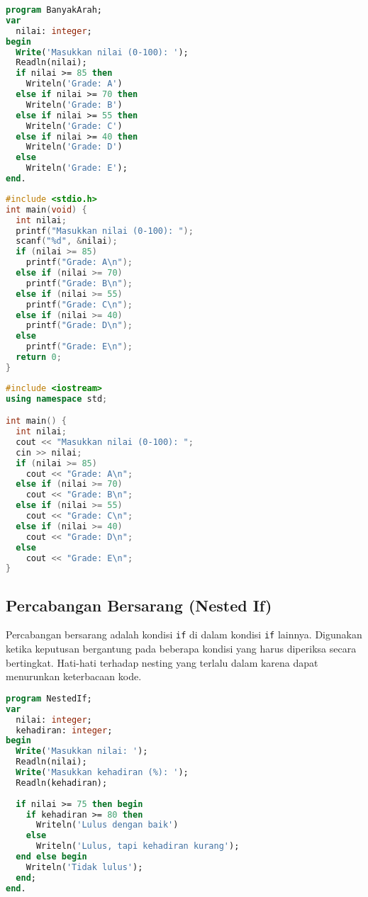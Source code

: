 \documentclass[../main.tex]{subfiles}
\begin{document}
\begin{lstlisting}[language=Pascal, caption={Percabangan banyak arah di Pascal}]
program BanyakArah;
var
  nilai: integer;
begin
  Write('Masukkan nilai (0-100): ');
  Readln(nilai);
  if nilai >= 85 then
    Writeln('Grade: A')
  else if nilai >= 70 then
    Writeln('Grade: B')
  else if nilai >= 55 then
    Writeln('Grade: C')
  else if nilai >= 40 then
    Writeln('Grade: D')
  else
    Writeln('Grade: E');
end.
\end{lstlisting}

\begin{lstlisting}[language=C, caption={Percabangan banyak arah di C}]
#include <stdio.h>
int main(void) {
  int nilai;
  printf("Masukkan nilai (0-100): ");
  scanf("%d", &nilai);
  if (nilai >= 85)
    printf("Grade: A\n");
  else if (nilai >= 70)
    printf("Grade: B\n");
  else if (nilai >= 55)
    printf("Grade: C\n");
  else if (nilai >= 40)
    printf("Grade: D\n");
  else
    printf("Grade: E\n");
  return 0;
}
\end{lstlisting}

\begin{lstlisting}[language=C++, caption={Percabangan banyak arah di C++}]
#include <iostream>
using namespace std;

int main() {
  int nilai;
  cout << "Masukkan nilai (0-100): ";
  cin >> nilai;
  if (nilai >= 85)
    cout << "Grade: A\n";
  else if (nilai >= 70)
    cout << "Grade: B\n";
  else if (nilai >= 55)
    cout << "Grade: C\n";
  else if (nilai >= 40)
    cout << "Grade: D\n";
  else
    cout << "Grade: E\n";
}
\end{lstlisting}

\subsection{Percabangan Bersarang (Nested If)}
Percabangan bersarang adalah kondisi \texttt{if} di dalam kondisi \texttt{if} lainnya. Digunakan ketika keputusan bergantung pada beberapa kondisi yang harus diperiksa secara bertingkat. Hati-hati terhadap nesting yang terlalu dalam karena dapat menurunkan keterbacaan kode.

\begin{lstlisting}[language=Pascal, caption={Nested if di Pascal}]
program NestedIf;
var
  nilai: integer;
  kehadiran: integer;
begin
  Write('Masukkan nilai: ');
  Readln(nilai);
  Write('Masukkan kehadiran (%): ');
  Readln(kehadiran);
  
  if nilai >= 75 then begin
    if kehadiran >= 80 then
      Writeln('Lulus dengan baik')
    else
      Writeln('Lulus, tapi kehadiran kurang');
  end else begin
    Writeln('Tidak lulus');
  end;
end.
\end{lstlisting}
\end{document}
